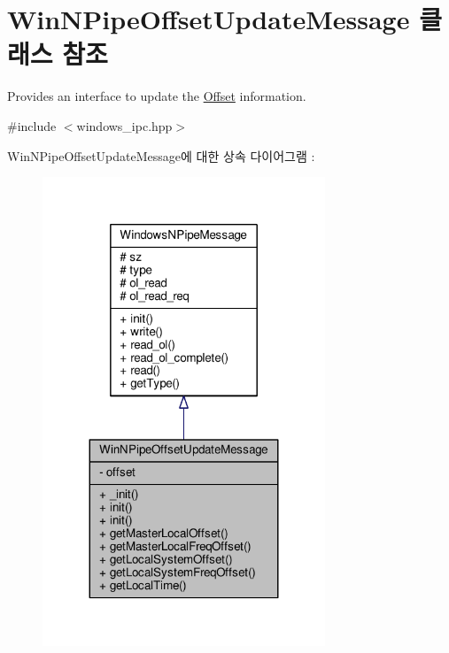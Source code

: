 \hypertarget{class_win_n_pipe_offset_update_message}{}\section{Win\+N\+Pipe\+Offset\+Update\+Message 클래스 참조}
\label{class_win_n_pipe_offset_update_message}


Provides an interface to update the \hyperlink{class_offset}{Offset} information.  




{\ttfamily \#include $<$windows\+\_\+ipc.\+hpp$>$}



Win\+N\+Pipe\+Offset\+Update\+Message에 대한 상속 다이어그램 \+: 
\nopagebreak
\begin{figure}[H]
\begin{center}
\leavevmode
\includegraphics[width=239pt]{class_win_n_pipe_offset_update_message__inherit__graph}
\end{center}
\end{figure}


